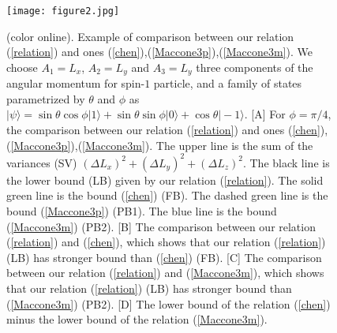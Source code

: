 \documentclass[fleqn,10pt]{wlscirep}
\begin{document}
%
\begin{figure}[ht]
\centering
\texttt{[image: figure2.jpg]}
\caption{(color online). Example of comparison between our relation (\ref{relation}) and ones (\ref{chen}),(\ref{Maccone3p}),(\ref{Maccone3m}).
We choose $A_1=L_x$, $A_2=L_y$ and $A_3=L_y$ three components of the angular momentum for spin-$1$ particle,
and a family of states parametrized by $\theta$ and $\phi$ as
$|\psi\rangle=\sin \theta \cos \phi |1\rangle+\sin \theta  \sin \phi |0\rangle+\cos \theta |-1\rangle$.
[A] For $\phi=\pi/4$, the comparison between our relation (\ref{relation}) and ones (\ref{chen}),(\ref{Maccone3p}),(\ref{Maccone3m}). The upper line is the sum of the variances (SV) $(\Delta L_x)^{2}+(\Delta L_y)^{2}+(\Delta L_z)^{2}$. The black line is the lower bound (LB) given by our relation (\ref{relation}).
The solid green line is the bound (\ref{chen}) (FB). The dashed green line is the bound (\ref{Maccone3p}) (PB1). The blue line is the bound (\ref{Maccone3m}) (PB2).
[B] The comparison between our relation (\ref{relation}) and (\ref{chen}), which shows that our relation (\ref{relation}) (LB) has stronger bound than (\ref{chen}) (FB).
[C] The comparison between our relation (\ref{relation}) and (\ref{Maccone3m}), which shows that our relation (\ref{relation}) (LB) has stronger bound than (\ref{Maccone3m}) (PB2).
[D] The lower bound of the relation (\ref{chen}) minus the lower bound of the relation (\ref{Maccone3m}). }\label{f2}
\end{figure}
\vspace{.1cm}
\end{document}
